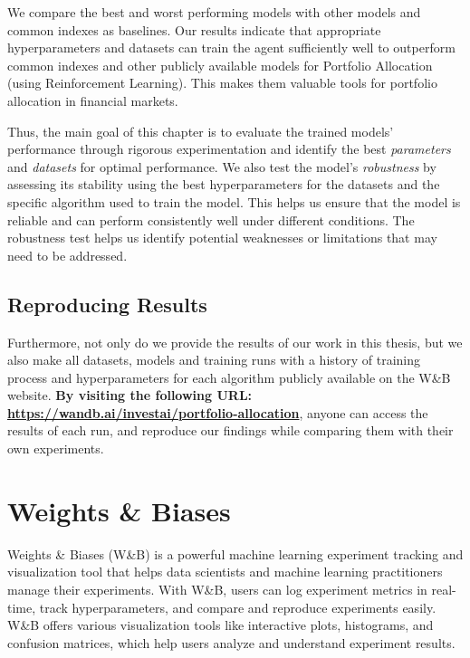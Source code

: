 \documentclass[../xlapes02]{subfiles}
\begin{document}
    We compare the best and worst performing models with other models and common indexes as baselines. Our results indicate that appropriate hyperparameters and datasets can train the agent sufficiently well to outperform common indexes and other publicly available models for Portfolio Allocation (using Reinforcement Learning). This makes them valuable tools for portfolio allocation in financial markets.

    Thus, the main goal of this chapter is to evaluate the trained models' performance through rigorous experimentation and identify the best \emph{parameters} and \emph{datasets} for optimal performance. We also test the model's \emph{robustness} by assessing its stability using the best hyperparameters for the datasets and the specific algorithm used to train the model. This helps us ensure that the model is reliable and can perform consistently well under different conditions. The robustness test helps us identify potential weaknesses or limitations that may need to be addressed.

    \subsection{Reproducing Results}
    Furthermore, not only do we provide the results of our work in this thesis, but we also make all datasets, models and training runs with a history of training process and hyperparameters for each algorithm publicly available on the W\&B website. \textbf{By visiting the following URL: \url{https://wandb.ai/investai/portfolio-allocation}}, anyone can access the results of each run, and reproduce our findings while comparing them with their own experiments.


    \section{Weights \& Biases}\label{sec:wandb}
    Weights \& Biases (W\&B) is a powerful machine learning experiment tracking and visualization tool that helps data scientists and machine learning practitioners manage their experiments. With W\&B, users can log experiment metrics in real-time, track hyperparameters, and compare and reproduce experiments easily. W\&B offers various visualization tools like interactive plots, histograms, and confusion matrices, which help users analyze and understand experiment results.
\end{document}
